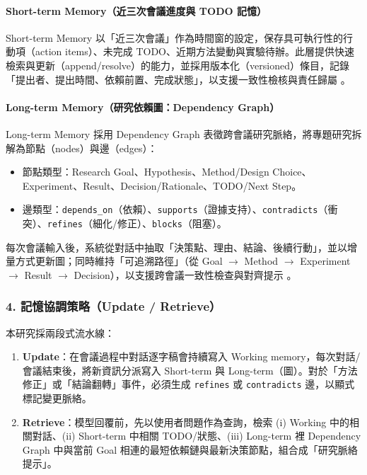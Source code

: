 \paragraph*{Short-term Memory（近三次會議進度與 TODO 記憶）}
Short-term Memory 以「近三次會議」作為時間窗的設定，保存具可執行性的行動項（action items）、未完成 TODO、近期方法變動與實驗待辦。此層提供快速檢索與更新（append/resolve）的能力，並採用版本化（versioned）條目，記錄「提出者、提出時間、依賴前置、完成狀態」，以支援一致性檢核與責任歸屬 \citep{a2305_10250v3_memorybank,a2504_19413v1_mem0}。

\paragraph*{Long-term Memory（研究依賴圖：Dependency Graph）}
Long-term Memory 採用 Dependency Graph 表徵跨會議研究脈絡，將專題研究拆解為節點（nodes）與邊（edges）：
\begin{itemize}
  \item 節點類型：Research Goal、Hypothesis、Method/Design Choice、Experiment、Result、Decision/Rationale、TODO/Next Step。
  \item 邊類型：\texttt{depends\_on}（依賴）、\texttt{supports}（證據支持）、\texttt{contradicts}（衝突）、\texttt{refines}（細化/修正）、\texttt{blocks}（阻塞）。
\end{itemize}
每次會議輸入後，系統從對話中抽取「決策點、理由、結論、後續行動」，並以增量方式更新圖；同時維持「可追溯路徑」（從 Goal $\rightarrow$ Method $\rightarrow$ Experiment $\rightarrow$ Result $\rightarrow$ Decision），以支援跨會議一致性檢查與對齊提示 \citep{a2602_05665v1_graphagentmemory,laskar-etal-2023-building,liu2025agendaaware_meetingsum}。

\subsubsection*{4. 記憶協調策略（Update / Retrieve）}
本研究採兩段式流水線：
\begin{enumerate}
  \item \textbf{Update}：在會議過程中對話逐字稿會持續寫入 Working memory，每次對話/會議結束後，將新資訊分派寫入 Short-term 與 Long-term（圖）。對於「方法修正」或「結論翻轉」事件，必須生成 \texttt{refines} 或 \texttt{contradicts} 邊，以顯式標記變更脈絡。
  \item \textbf{Retrieve}：模型回覆前，先以使用者問題作為查詢，檢索 (i) Working 中的相關對話、(ii) Short-term 中相關 TODO/狀態、(iii) Long-term 裡 Dependency Graph 中與當前 Goal 相連的最短依賴鏈與最新決策節點，組合成「研究脈絡提示」。
\end{enumerate}

